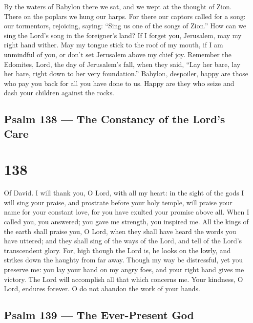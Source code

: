  By the waters of Babylon there we sat, and we wept at the
thought of Zion.  There on the poplars we hung our harps.
 For there our captors called for a song: our tormentors,
rejoicing, saying: ``Sing us one of the songs of Zion.'' 
How can we sing the Lord's song in the foreigner's land?  If
I forget you, Jerusalem, may my right hand wither.  May my
tongue stick to the roof of my mouth, if I am unmindful of you, or don't
set Jerusalem above my chief joy.  Remember the Edomites,
Lord, the day of Jerusalem's fall, when they said, ``Lay her bare, lay
her bare, right down to her very foundation.''  Babylon,
despoiler, happy are those who pay you back for all you have done to us.
 Happy are they who seize and dash your children against the
rocks.

\hypertarget{psalm-138-the-constancy-of-the-lords-care}{%
\subsection{Psalm 138 --- The Constancy of the Lord's
Care}\label{psalm-138-the-constancy-of-the-lords-care}}

\hypertarget{section-137}{%
\section{138}\label{section-137}}

Of David.  I will thank you, O Lord, with all my heart: in
the sight of the gods I will sing your praise,  and
prostrate before your holy temple, will praise your name for your
constant love, for you have exulted your promise above all. 
When I called you, you answered; you gave me strength, you inspired me.
 All the kings of the earth shall praise you, O Lord, when
they shall have heard the words you have uttered;  and they
shall sing of the ways of the Lord, and tell of the Lord's transcendent
glory.  For, high though the Lord is, he looks on the lowly,
and strikes down the haughty from far away.  Though my way
be distressful, yet you preserve me: you lay your hand on my angry foes,
and your right hand gives me victory.  The Lord will
accomplish all that which concerns me. Your kindness, O Lord, endures
forever. O do not abandon the work of your hands.

\hypertarget{psalm-139-the-ever-present-god}{%
\subsection{Psalm 139 --- The Ever-Present
God}\label{psalm-139-the-ever-present-god}}

